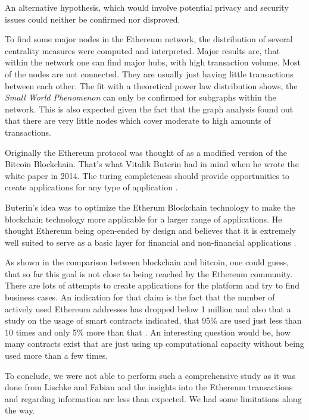 An alternative hypothesis, which would involve potential privacy and security issues could neither be confirmed nor disproved.

To find some major nodes in the Ethereum network, the distribution of several centrality measures were computed and interpreted. 
Major results are, that within the network one can find major hubs, with high transaction volume. Most of the nodes are not connected. 
They are usually just having little transactions between each other. 
The fit with a theoretical power law distribution shows, the \emph{Small World Phenomenon} can only be confirmed for subgraphs within the network.
This is also expected given the fact that the graph analysis found out that there are very little nodes which cover moderate to high amounts of transactions.

Originally the Ethereum protocol was thought of as a modified version of the Bitcoin Blockchain. 
That's what Vitalik Buterin had in mind when he wrote the white paper in 2014. 
The turing completeness should provide opportunities to create applications for any type of application \cite{vitalikwhite}.

Buterin's idea was to optimize the Etherum Blockchain technology to make the blockchain technology more applicable for a larger range of applications. 
He thought Ethereum being open-ended by design and believes that it is extremely well suited to serve as a basic layer for financial and non-financial applications \cite{vitalikwhite}.

As shown in the comparison between blockchain and bitcoin, one could guess, that so far this goal is not close to being reached by the Ethereum community. 
There are lots of attempts to create applications for the platform and try to find business cases. 
An indication for that claim is the fact that the number of actively used Ethereum addresses has dropped below 1 million and also that a study on the usage of smart contracts indicated, that 95\% are used just less than 10 times and only 5\% more than that \cite{Chandersekhar2018}.
An interesting question would be, how many contracts exist that are just using up computational capacity without being used more than a few times.

To conclude, we were not able to perform such a comprehensive study as it was done from Lischke and Fabian and the insights into the Ethereum transactions and regarding information are less than expected. 
We had some limitations along the way.


